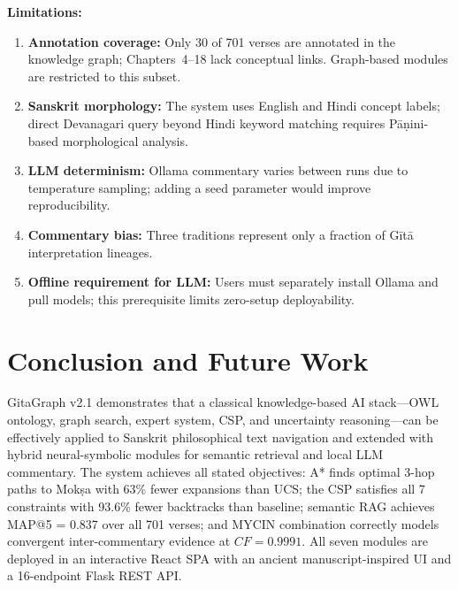 \documentclass[conference]{IEEEtran}
\begin{document}
\textbf{Limitations:}
\begin{enumerate}[leftmargin=*]
  \item \textbf{Annotation coverage:} Only 30 of 701 verses are annotated in the
        knowledge graph; Chapters~4--18 lack conceptual links. Graph-based modules
        are restricted to this subset.
  \item \textbf{Sanskrit morphology:} The system uses English and Hindi concept labels;
        direct Devanagari query beyond Hindi keyword matching requires P\={a}{\d{n}}ini-based
        morphological analysis.
  \item \textbf{LLM determinism:} Ollama commentary varies between runs due to
        temperature sampling; adding a seed parameter would improve reproducibility.
  \item \textbf{Commentary bias:} Three traditions represent only a fraction of
        G\={i}t\={a} interpretation lineages.
  \item \textbf{Offline requirement for LLM:} Users must separately install Ollama
        and pull models; this prerequisite limits zero-setup deployability.
\end{enumerate}

\section{Conclusion and Future Work}

GitaGraph v2.1 demonstrates that a classical knowledge-based AI stack—OWL
ontology, graph search, expert system, CSP, and uncertainty reasoning—can be
effectively applied to Sanskrit philosophical text navigation and extended with
hybrid neural-symbolic modules for semantic retrieval and local LLM commentary.
The system achieves all stated objectives: A* finds optimal 3-hop paths to
Mok\d{s}a with 63\% fewer expansions than UCS; the CSP satisfies all 7 constraints
with 93.6\% fewer backtracks than baseline; semantic RAG achieves MAP@5 = 0.837
over all 701 verses; and MYCIN combination correctly models convergent
inter-commentary evidence at $CF = 0.9991$. All seven modules are deployed in
an interactive React SPA with an ancient manuscript-inspired UI and a
16-endpoint Flask REST API.
\end{document}
